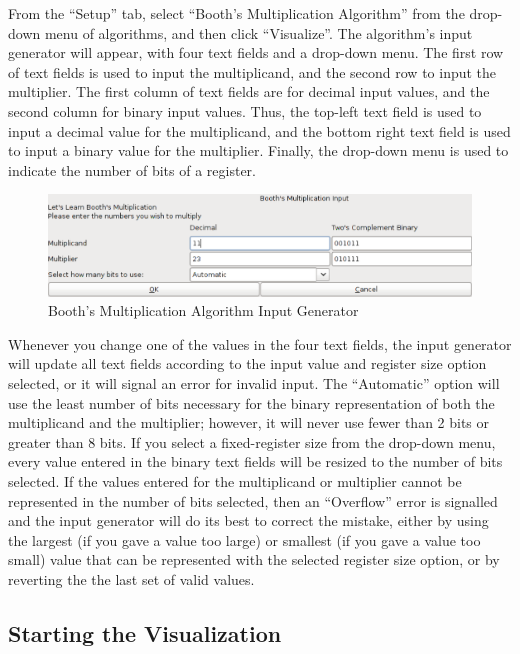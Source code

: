 \documentclass{article}
\begin{document}
From the ``Setup'' tab, select ``Booth's Multiplication Algorithm'' from the drop-down menu of algorithms, and then click ``Visualize''.
The algorithm's input generator will appear, with four text fields and a drop-down menu.
The first row of text fields is used to input the multiplicand, and the second row to input the multiplier.
The first column of text fields are for decimal input values, and the second column for binary input values.
Thus, the top-left text field is used to input a decimal value for the multiplicand, and the bottom right text field is used to input a binary value for the multiplier.
Finally, the drop-down menu is used to indicate the number of bits of a register.

\begin{figure}[h]
\centering
\includegraphics[scale=0.3]{ingen.pdf}
\caption{Booth's Multiplication Algorithm Input Generator}
\end{figure}

Whenever you change one of the values in the four text fields, the input generator will update all text fields according to the input value and register size option selected, or it will signal an error for invalid input.
The ``Automatic'' option will use the least number of bits necessary for the binary representation of both the multiplicand and the multiplier; however, it will never use fewer than 2 bits or greater than 8 bits.
If you select a fixed-register size from the drop-down menu, every value entered in the binary text fields will be resized to the number of bits selected.
If the values entered for the multiplicand or multiplier cannot be represented in the number of bits selected, then an ``Overflow'' error is signalled and the input generator will do its best to correct the mistake, either by using the largest (if you gave a value too large) or smallest (if you gave a value too small) value that can be represented with the selected register size option, or by reverting the the last set of valid values.

\pagebreak
\subsection{Starting the Visualization}
\end{document}

